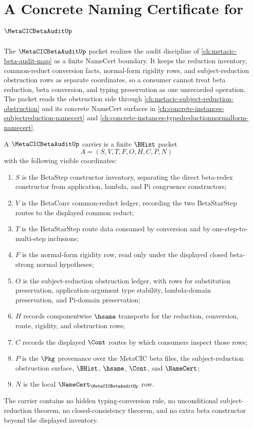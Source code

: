 \chapter{A Concrete Naming Certificate for $\MetaCICBetaAuditUp$}
\label{ch:concrete-instances-metacicbetaaudit-namecert}

The $\MetaCICBetaAuditUp$ packet realizes the audit discipline of \autoref{ch:metacic-beta-audit-map} as a finite NameCert boundary. It keeps the reduction inventory, common-reduct conversion facts, normal-form rigidity rows, and subject-reduction obstruction rows as separate coordinates, so a consumer cannot treat beta reduction, beta conversion, and typing preservation as one unrecorded operation. The packet reads the obstruction side through \autoref{ch:metacic-subject-reduction-obstruction} and its concrete NameCert surfaces in \autoref{ch:concrete-instances-subjectreduction-namecert} and \autoref{ch:concrete-instances-typedreductionnormalform-namecert}.

\begin{definition}
\label{def:metacic-beta-audit-carrier}
A $\MetaCICBetaAuditUp$ carrier is a finite $\BHist$ packet
$$
A=(S,V,T,F,O,H,C,P,N)
$$
with the following visible coordinates:
\begin{enumerate}
\item $S$ is the $\mathrm{BetaStep}$ constructor inventory, separating the direct beta-redex constructor from application, lambda, and Pi congruence constructors;
\item $V$ is the $\mathrm{BetaConv}$ common-reduct ledger, recording the two $\mathrm{BetaStarStep}$ routes to the displayed common reduct;
\item $T$ is the $\mathrm{BetaStarStep}$ route data consumed by conversion and by one-step-to-multi-step inclusions;
\item $F$ is the normal-form rigidity row, read only under the displayed closed beta-strong normal hypotheses;
\item $O$ is the subject-reduction obstruction ledger, with rows for substitution preservation, application-argument type stability, lambda-domain preservation, and Pi-domain preservation;
\item $H$ records componentwise $\hsame$ transports for the reduction, conversion, route, rigidity, and obstruction rows;
\item $C$ records the displayed $\Cont$ routes by which consumers inspect those rows;
\item $P$ is the $\Pkg$ provenance over the MetaCIC beta files, the subject-reduction obstruction surface, $\BHist$, $\hsame$, $\Cont$, and $\NameCert$;
\item $N$ is the local $\NameCert_{\MetaCICBetaAuditUp}$ row.
\end{enumerate}
The carrier contains no hidden typing-conversion rule, no unconditional subject-reduction theorem, no closed-consistency theorem, and no extra beta constructor beyond the displayed inventory.
\end{definition}

